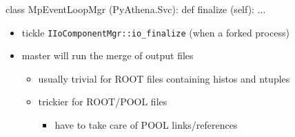 \documentclass[10pt]{beamer}
\newcommand{\myred}  [1] {{\color{red}#1}}
\begin{document}
\begin{frame}[fragile]{}

  \begin{columns}
    \begin{column}{0.95\textwidth}

\begin{python}
class MpEventLoopMgr (PyAthena.Svc):
    def finalize (self): ...
\end{python}

\begin{block}{}
\begin{itemize}
  \item tickle \myred{\texttt{IIoComponentMgr::io\_finalize}} (when a forked process)
  \item master will run the merge of output files
    \begin{itemize}
      \item usually trivial for ROOT files containing histos and ntuples
      \item trickier for ROOT/POOL files
        \begin{itemize}
          \item have to take care of POOL links/references
        \end{itemize}
    \end{itemize}
\end{itemize}
\end{block}
    \end{column}
  \end{columns}
\end{frame}
\end{document}
